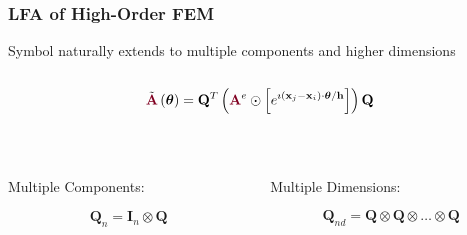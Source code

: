 \documentclass{beamer}
\begin{document}
\begin{frame}
\begin{center}
\frametitle{LFA of High-Order FEM}

Symbol naturally extends to multiple components and higher dimensions\\

~\\

\begin{equation}
\tilde{{\color{burgundy}\mathbf{A}}} \left( \boldsymbol{\theta} \right) = \mathbf{Q}^T \left( {\color{burgundy}\mathbf{A}}^e \odot \left[ e^{\imath \left( \mathbf{x}_j - \mathbf{x}_i \right) \cdot \boldsymbol{\theta} / \mathbf{h}} \right] \right) \mathbf{Q}
\label{eq:symbolhighorder}
\end{equation}

~\\

\begin{columns}[onlytextwidth]
  \begin{column}{0.45\textwidth}
    \begin{center}
    Multiple Components:
    \end{center}
    \begin{equation}
    \mathbf{Q}_n = \mathbf{I}_n \otimes \mathbf{Q}
    \end{equation}
  \end{column}

  \begin{column}{0.45\textwidth}
    \begin{center}
    Multiple Dimensions:
    \end{center}
    \begin{equation}
    \mathbf{Q}_{nd} = \mathbf{Q} \otimes \mathbf{Q} \otimes \dots \otimes \mathbf{Q}
    \end{equation}
  \end{column}
\end{columns}

\end{center}
\end{frame}

\end{document}
